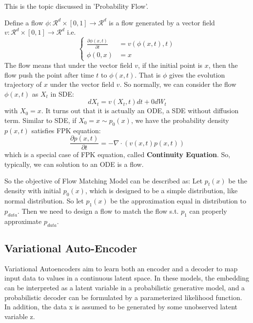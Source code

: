 This is the topic discussed in 'Probability Flow'.

Define a flow $\phi: \mathcal{R}^d\times [0, 1]\rightarrow \mathcal{R}^d$ is a flow generated by a vector field $v: \mathcal{R}^d \times [0, 1]\rightarrow \mathcal{R}^d$ i.e.
\begin{equation}\left\{
    \begin{aligned}
        \frac{\partial \phi(x, t)}{\partial t} &= v(\phi(x, t), t)\\
        \phi(0, x)&=x
    \end{aligned}\right.
\end{equation}
The flow means that under the vector field $v$, if the initial point is $x$, then the flow push the point after time $t$ to $\phi(x, t)$. That is $\phi$ gives the evolution trajectory of $x$ under the vector field $v$.
So normally, we can consider the flow $\phi(x, t)$ as $X_t$ in SDE:
\begin{equation}
    dX_t = v(X_t, t)dt + 0dW_t
\end{equation}
with $X_0=x$. It turns out that it is actually an ODE, a SDE without diffusion term. Similar to SDE, if $X_0=x\sim p_0(x)$, we have the probability density $p(x, t)$ satisfies FPK equation:
\begin{equation}
    \frac{\partial p(x, t)}{\partial t}=-\nabla\cdot\left(v(x, t)p(x, t)\right)
\end{equation}
which is a special case of FPK equation, called \textbf{Continuity Equation}. So, typically, we can solution to an ODE is a flow.



So the objective of Flow Matching Model can be described as: Let $p_t(x)$ be the density with initial $p_0(x)$, which is designed to be a simple distribution, like normal distribution. 
So let $p_1(x)$ be the approximation equal in distribution to$ p_{data}$. Then we need to design a flow to match the flow s.t. $p_1$ can properly approximate $p_{data}$.

\subsection{Variational Auto-Encoder}
Variational Autoencoders aim to learn both an encoder and a decoder to map input data to values in  a continuous latent space.
In these models, the embedding can be interpreted as a latent variable in a probabilistic  generative model, and a probabilistic decoder can be formulated by a parameterized likelihood function. In addition,  the data x is assumed to be generated by some unobserved latent variable z.

